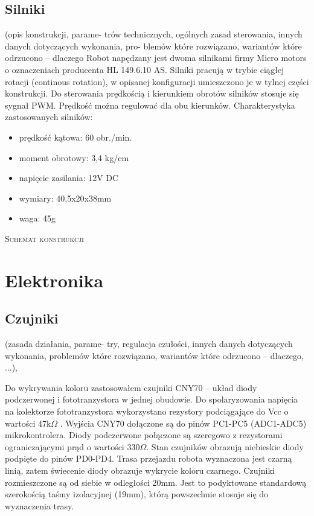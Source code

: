 \documentclass[11pt,a4paper]{article}
\begin{document}
\subsection{Silniki}
(opis konstrukcji, parame-
trów technicznych, ogólnych zasad sterowania, innych danych dotyczących wykonania, pro-
blemów które rozwiązano, wariantów które odrzucono – dlaczego
Robot napędzany jest dwoma silnikami firmy Micro motors o oznaczeniach producenta HL 149.6.10 AS.
  Silniki pracują w trybie ciągłej rotacji (continous rotation), w opisanej konfiguracji umieszczono je w tylnej części konstrukcji. 
  Do sterowania prędkością i kierunkiem obrotów silników stosuje się sygnał PWM. Prędkość można regulować dla obu kierunków.
  Charakterystyka zastosowanych silników:
  \begin{itemize}
    \item prędkość kątowa: 60 obr./min.
    \item moment obrotowy: 3,4 kg/cm
    \item napięcie zasilania: 12V DC
    \item wymiary: 40,5x20x38mm
    \item waga: 45g
  \end{itemize}
 
  \textsc{Schemat konstrukcji}

\section{Elektronika}

\subsection{Czujniki}
(zasada działania, parame-
try, regulacja czułości, innych danych dotyczących wykonania, problemów które rozwiązano,
wariantów które odrzucono – dlaczego, ...),

Do wykrywania koloru zastosowałem czujniki CNY70 – układ diody podczerwonej i fototranzystora w jednej obudowie. Do spolaryzowania napięcia na kolektorze fototranzystora wykorzystano rezystory podciągające do Vcc o wartości 47k$\Omega$ . Wyjścia CNY70 dołączone są do pinów PC1-PC5 (ADC1-ADC5) mikrokontrolera.
  Diody podczerwone połączone są szeregowo z rezystorami ograniczającymi prąd o wartości 330$\Omega$.
  Stan czujników obrazują niebieskie diody podpięte do pinów PD0-PD4. 
  Trasa przejazdu robota wyznaczona jest czarną linią, zatem świecenie diody obrazuje wykrycie koloru czarnego.
  Czujniki rozmieszczone są od siebie w odległości 20mm. Jest to podyktowane standardową szerokością taśmy izolacyjnej (19mm), którą powszechnie stosuje się do wyznaczenia trasy.
  
\end{document}

